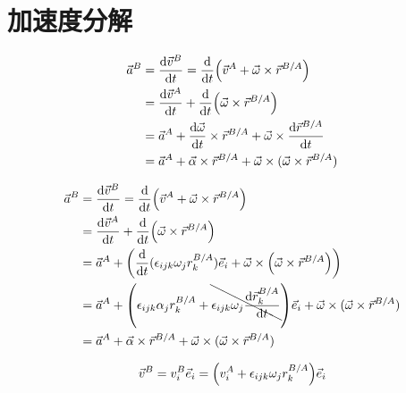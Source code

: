 \section{加速度分解}
\begin{equation}
  \begin{split}
    \vec{a}^B&=\frac{\mathrm{d}\vec{v}^B}{\mathrm{d}t}=\frac{\mathrm{d}}{\mathrm{d}t}\qty(\vec{v}^A+\vec{\omega}\times\vec{r}^{B/A})\\
    &=\frac{\mathrm{d}\vec{v}^A}{\mathrm{d}t}+\frac{\mathrm{d}}{\mathrm{d}t}\qty(\vec{\omega}\times\vec{r}^{B/A})\\
    &=\vec{a}^A+\frac{\mathrm{d}\vec{\omega}}{\mathrm{d}t}\times\vec{r}^{B/A}+\vec{\omega}\times\frac{\mathrm{d}\vec{r}^{B/A}}{\mathrm{d}t}\\
    &=\vec{a}^A+\vec{\alpha}\times\vec{r}^{B/A}+\vec{\omega}\times(\vec{\omega}\times\vec{r}^{B/A})
  \end{split}
\end{equation}

\begin{equation}
  \begin{split}
    \vec{a}^B&=\frac{\mathrm{d}\vec{v}^B}{\mathrm{d}t}=\frac{\mathrm{d}}{\mathrm{d}t}\qty(\vec{v}^A+\vec{\omega}\times\vec{r}^{B/A})\\
    &=\frac{\mathrm{d}\vec{v}^A}{\mathrm{d}t}+\frac{\mathrm{d}}{\mathrm{d}t}\qty(\vec{\omega}\times\vec{r}^{B/A})\\
    &=\vec{a}^A+\qty(\frac{\mathrm{d}}{\mathrm{d}t}(\epsilon_{ijk}\omega_jr^{B/A}_k)\vec{e}_i+\vec{\omega}\times\qty(\vec{\omega}\times\vec{r}^{B/A}))\\
    &=\vec{a}^A+\qty(\epsilon_{ijk}\alpha_jr^{B/A}_k+\bcancel{\epsilon_{ijk}\omega_j\frac{\mathrm{d}\vec{r}^{B/A}_k}{\mathrm{d}t}})\vec{e}_i+\vec{\omega}\times(\vec{\omega}\times\vec{r}^{B/A})\\
    &=\vec{a}^A+\vec{\alpha}\times\vec{r}^{B/A}+\vec{\omega}\times(\vec{\omega}\times\vec{r}^{B/A})
  \end{split}
\end{equation}

\begin{equation}
  \vec{v}^B=v^B_i\vec{e}_i=\qty(v^A_i+\epsilon_{ijk}\omega_jr^{B/A}_k)\vec{e}_i
\end{equation}


